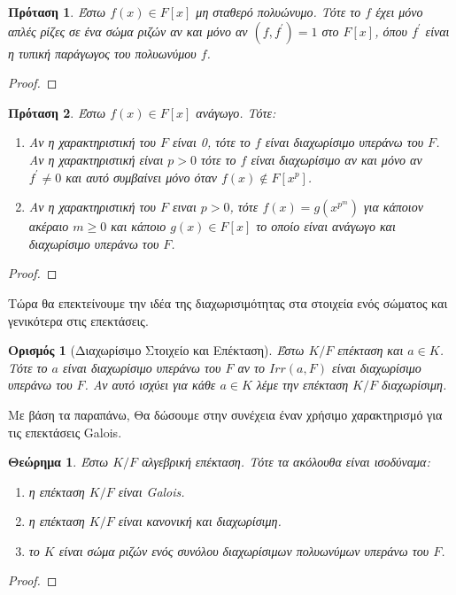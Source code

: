 \documentclass[oneside,a4paper]{article}
\newtheorem{theorem}{Θεώρημα}
\newtheorem*{defn}{Ορισμός}
\newtheorem{prop}{Πρόταση}
\newcommand {\tl}{\textlatin}
\begin{document}
\begin{prop}Έστω $f(x) \in F[x]$ μη σταθερό πολυώνυμο. Τότε το $f$ έχει μόνο απλές ρίζες σε ένα σώμα ριζών αν και μόνο αν $(f,f^{\prime})=1$ στο $F[x]$, όπου $f^{\prime}$ είναι η τυπική παράγωγος του πολυωνύμου $f$.

\end{prop}

\begin{proof}
\end{proof}

\begin{prop}Έστω $f(x) \in F[x]$ ανάγωγο. Τότε:
	\begin{enumerate} 
		\item Αν η χαρακτηριστική του $F$ είναι 0, τότε το $f$ είναι διαχωρίσιμο υπεράνω του $F$. Αν η χαρακτηριστική είναι $p > 0$ τότε το $f$ είναι διαχωρίσιμο αν και μόνο αν $f^{\prime} \neq 0$ και αυτό συμβαίνει μόνο όταν $f(x) \not\in F[x^p]$.
		\item Αν η χαρακτηριστική του $F$ ειναι $p>0$, τότε $f(x) = g(x^{p^m})$ για κάποιον ακέραιο $m\geq 0$ και κάποιο $g(x) \in F[x]$ το οποίο είναι ανάγωγο και διαχωρίσιμο υπεράνω του $F$.
	\end{enumerate}
\end{prop}
\begin{proof}
\end{proof}


\noindent Τώρα θα επεκτείνουμε την ιδέα της διαχωρισιμότητας στα στοιχεία ενός σώματος και γενικότερα στις επεκτάσεις.

\begin{defn}[Διαχωρίσιμο Στοιχείο και Επέκταση]
	Έστω $K/F$ επέκταση και $a \in K$. Τότε το $a$ είναι διαχωρίσιμο υπεράνω του $F$ αν το $Irr(a,F)$ είναι διαχωρίσιμο υπεράνω του $F$. Αν αυτό ισχύει για κάθε $a \in K$ λέμε την επέκταση $K/F$ διαχωρίσιμη.
\end{defn}

\noindent Με βάση τα παραπάνω, Θα δώσουμε στην συνέχεια έναν χρήσιμο χαρακτηρισμό για τις επεκτάσεις \tl{Galois}.

\begin{theorem}
	Έστω $K/F$ αλγεβρική επέκταση. Τότε τα ακόλουθα είναι ισοδύναμα:
	\begin{enumerate}
		\item η επέκταση $K/F$ είναι \tl{Galois}.
		\item η επέκταση $K/F$ είναι κανονική και διαχωρίσιμη.
		\item το $K$ είναι σώμα ριζών ενός συνόλου διαχωρίσιμων πολυωνύμων υπεράνω του $F$.
	\end{enumerate}
\end{theorem}
\begin{proof}
\end{proof}
\end{document}

